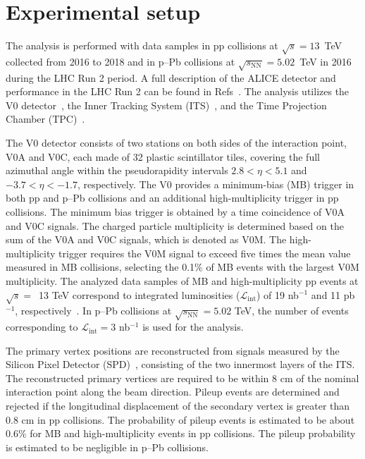 

\section{Experimental setup}
\label{sec:experiment}

The analysis is performed with data samples in pp collisions at $\sqrt{s} = 13$~TeV collected from 2016 to 2018 and in p--Pb collisions at $\sqrt{s_\mathrm{NN}} = 5.02$~TeV in 2016 during the LHC Run 2 period. A full description of the ALICE detector and performance in the LHC Run 2 can be found in Refs~\cite{Aamodt:2008zz,Abelev:2014ffa}. The analysis utilizes the V0 detector~\cite{Abbas:2013taa}, the Inner Tracking System (ITS)~\cite{aliceITS}, and the Time Projection Chamber (TPC)~\cite{aliceTPC}. 

The V0 detector consists of two stations on both sides of the interaction point, V0A and V0C, each made of 32 plastic scintillator tiles, covering the full azimuthal angle within the pseudorapidity intervals $2.8 < \eta < 5.1$ and $-3.7 < \eta < -1.7$, respectively. The V0 provides a minimum-bias (MB) trigger in both pp and p--Pb collisions and an additional high-multiplicity trigger in pp collisions. The minimum bias trigger is obtained by a time coincidence of V0A and V0C signals. The charged particle multiplicity is determined based on the sum of the V0A and V0C signals, which is denoted as V0M. The high-multiplicity trigger requires the V0M signal to exceed five times the mean value measured in MB collisions, selecting the 0.1\% of MB events with the largest V0M multiplicity. The analyzed data samples of MB and high-multiplicity pp events at $\sqrt{s}=$~13 TeV correspond to integrated luminosities ($\mathcal{L}_\mathrm{int}$) of 19 nb$^{-1}$ and 11 pb$^{-1}$, respectively~\cite{ALICE-PUBLIC-2016-002}. In p--Pb collisions at $\sqrt{s_\mathrm{NN}} = 5.02$ TeV, the number of events corresponding to $\mathcal{L}_\mathrm{int} = 3$ nb$^{-1}$ is used for the analysis. 

The primary vertex positions are reconstructed from signals measured by the Silicon Pixel Detector (SPD)~\cite{Santoro2009:ALICESPD}, consisting of the two innermost layers of the ITS. The reconstructed primary vertices are required to be within 8 cm of the nominal interaction point along the beam direction. Pileup events are determined and rejected if the longitudinal displacement of the secondary vertex is greater than 0.8 cm in pp collisions. The probability of pileup events is estimated to be about 0.6\% for MB and high-multiplicity events in pp collisions. The pileup probability is estimated to be negligible in p--Pb collisions. 

